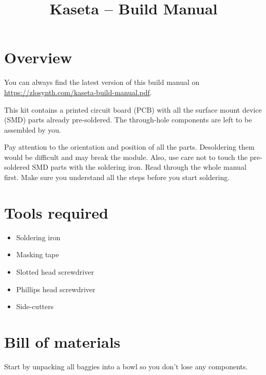 \documentclass[10pt,a4paper,twocolumn]{article}
\begin{document}
\title{Kaseta -- Build Manual}
\author{}
\date{}

\maketitle

\section{Overview}

You can always find the latest version of this build manual on
\url{https://zlosynth.com/kaseta-build-manual.pdf}.

This kit contains a printed circuit board (PCB) with all the surface mount
device (SMD) parts already pre-soldered. The through-hole components are left to
be assembled by you.

Pay attention to the orientation and position of all the parts. Desoldering them
would be difficult and may break the module. Also, use care not to touch the
pre-soldered SMD parts with the soldering iron. Read through the whole manual
first. Make sure you understand all the steps before you start soldering.

\newpage

\section{Tools required}

\begin{itemize}
  \item Soldering iron
  \item Masking tape
  \item Slotted head screwdriver
  \item Phillips head screwdriver
  \item Side-cutters
\end{itemize}

\newpage

\section{Bill of materials}

Start by unpacking all baggies into a bowl so you don't lose any components.
\end{document}
